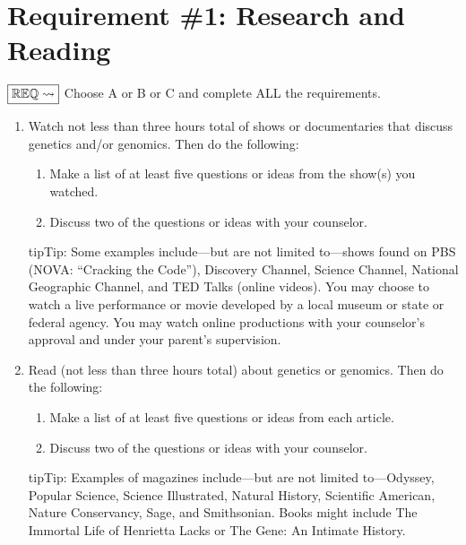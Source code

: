 \documentclass[letterpaper,10pt,english,openany,oneside]{sphinxmanual}
\begin{document}
\chapter{Requirement \#1: Research and Reading}
\label{\detokenize{requirement1:requirement-1-research-and-reading}}\label{\detokenize{requirement1::doc}}
\(\boxed{\mathbb{REQ}\Large \rightsquigarrow}\) Choose A or B or C and complete ALL the requirements.
\begin{enumerate}
%
\item {} 
Watch not less than three hours total of shows or documentaries that discuss genetics and/or genomics. Then do the following:
\begin{enumerate}
%
\item {} 
Make a list of at least five questions or ideas from the show(s) you watched.

\item {} 
Discuss two of the questions or ideas with your counselor.

\end{enumerate}

\begin{sphinxadmonition}{tip}{Tip:}
Some examples include—but are not limited to—shows found on PBS (NOVA: “Cracking the Code”), Discovery Channel, Science Channel, National Geographic Channel, and TED Talks (online videos). You may choose to watch a live performance or movie developed by a local museum or state or federal agency. You may watch online productions with your counselor’s approval and under your parent’s supervision.
\end{sphinxadmonition}

\item {} 
Read (not less than three hours total) about genetics or genomics. Then do the following:
\begin{enumerate}
%
\item {} 
Make a list of at least five questions or ideas from each article.

\item {} 
Discuss two of the questions or ideas with your counselor.

\end{enumerate}

\begin{sphinxadmonition}{tip}{Tip:}
Examples of magazines include—but are not limited to—Odyssey, Popular Science, Science Illustrated, Natural History, Scientific American, Nature Conservancy, Sage, and Smithsonian. Books might include The Immortal Life of Henrietta Lacks or The Gene: An Intimate History.
\end{sphinxadmonition}


\end{enumerate}
\end{document}
